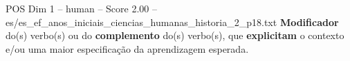 \begin{textsample}{POS Dim 1 – human – Score 2.00 – es/es\_ef\_anos\_iniciais\_ciencias\_humanas\_historia\_2\_p18.txt}  \label{ex:f1_pos_006}
\textbf{Modificador} do(s) verbo(s) ou do \textbf{complemento} do(s) verbo(s), que \textbf{explicitam} o contexto e/ou uma maior especificação da aprendizagem esperada.

\end{textsample}
